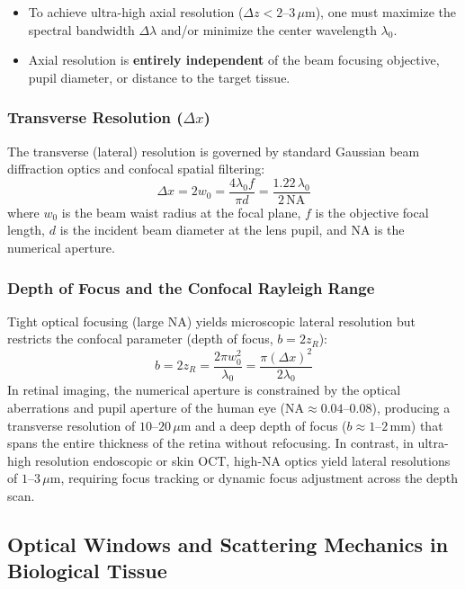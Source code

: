 \documentclass[11pt,a4paper]{article}
\begin{document}
\begin{itemize}[leftmargin=*]
    \item To achieve ultra-high axial resolution ($\Delta z < 2\text{--}3\,\mu\text{m}$), one must maximize the spectral bandwidth $\Delta\lambda$ and/or minimize the center wavelength $\lambda_0$.
    \item Axial resolution is \textbf{entirely independent} of the beam focusing objective, pupil diameter, or distance to the target tissue.
\end{itemize}

\subsubsection{Transverse Resolution ($\Delta x$)}
The transverse (lateral) resolution is governed by standard Gaussian beam diffraction optics and confocal spatial filtering:
\begin{equation}
    \Delta x = 2 w_0 = \frac{4 \lambda_0 f}{\pi d} = \frac{1.22 \, \lambda_0}{2 \, \text{NA}}
\end{equation}
where $w_0$ is the beam waist radius at the focal plane, $f$ is the objective focal length, $d$ is the incident beam diameter at the lens pupil, and $\text{NA}$ is the numerical aperture.

\subsubsection{Depth of Focus and the Confocal Rayleigh Range}
Tight optical focusing (large $\text{NA}$) yields microscopic lateral resolution but restricts the confocal parameter (depth of focus, $b = 2 z_R$):
\begin{equation}
    b = 2 z_R = \frac{2 \pi w_0^2}{\lambda_0} = \frac{\pi (\Delta x)^2}{2 \lambda_0}
\end{equation}
In retinal imaging, the numerical aperture is constrained by the optical aberrations and pupil aperture of the human eye ($\text{NA} \approx 0.04\text{--}0.08$), producing a transverse resolution of $10\text{--}20\,\mu\text{m}$ and a deep depth of focus ($b \approx 1\text{--}2\,\text{mm}$) that spans the entire thickness of the retina without refocusing. In contrast, in ultra-high resolution endoscopic or skin OCT, high-$\text{NA}$ optics yield lateral resolutions of $1\text{--}3\,\mu\text{m}$, requiring focus tracking or dynamic focus adjustment across the depth scan.

\subsection{Optical Windows and Scattering Mechanics in Biological Tissue}
\end{document}
